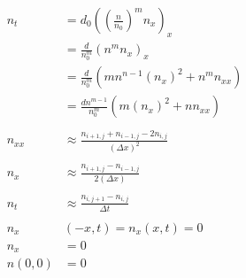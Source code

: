 \documentclass[]{report}
\begin{document}
	\begin{align}
		n_t &= d_0 \left( \left(\frac{n}{n_0}\right)^m n_x \right)_x \\
		&= \frac{d}{n_{0}^m} \left( n^m n_x \right)_x \\
		&= \frac{d}{n_{0}^m} \left( mn^{n - 1} (n_x)^2 + n^m n_{xx} \right) \\
		&= \frac{dn^{m - 1}}{n_{0}^m} \left( m(n_x)^2 + nn_{xx} \right) \\ \nonumber \\
		n_{xx} &\approx \frac{n_{i + 1, j} + n_{i - 1, j} -2n_{i, j}}{(\Delta x)^2} \\ \nonumber \\
		n_x &\approx \frac{n_{i + 1, j} - n_{i - 1, j}}{2(\Delta x)} \\ \nonumber \\
		n_t &\approx \frac{n_{i, j + 1} - n_{i, j}}{\Delta t} \\ \nonumber \\
		n_x&(-x, t) = n_x(x, t) = 0 \\ n_x &= 0 \nonumber \\ n(0, 0) &= 0 \nonumber \\ \nonumber \\
	\end{align}
\end{document}
